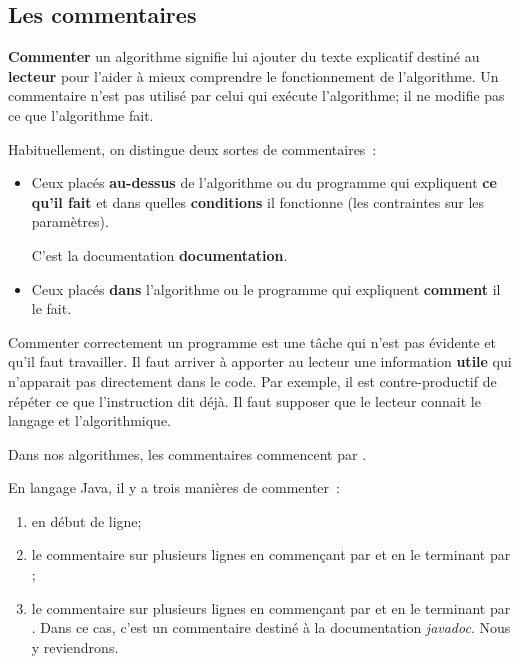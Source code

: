 				
		\subsection{Les commentaires}
	
			\textbf{Commenter} un algorithme
			signifie lui ajouter du texte explicatif
			destiné au \textbf{lecteur} pour l’aider à mieux
			comprendre le fonctionnement de l’algorithme.
			Un commentaire n’est pas utilisé par celui qui exécute
			l’algorithme; il ne modifie pas ce que l’algorithme fait.
			
			Habituellement, on distingue deux sortes de commentaires~:
			\begin{itemize}
			\item
				Ceux placés \textbf{au-dessus} de l’algorithme ou du programme
				qui expliquent \textbf{ce qu'il fait} 
				et dans quelles \textbf{conditions} il fonctionne
				(les contraintes sur les paramètres).
				\par C'est la documentation \textbf{documentation}.
			\item
				Ceux placés \textbf{dans} l’algorithme ou le programme
				qui expliquent \textbf{comment} il le fait.
			\end{itemize}
			
			Commenter correctement un programme est une tâche qui n’est pas
			évidente et qu’il faut travailler.  Il faut arriver à apporter au
			lecteur une information \textbf{utile} qui n’apparait pas
			directement dans le code.  Par exemple, il est contre-productif de
			répéter ce que l’instruction dit déjà. Il faut supposer que le 
			lecteur connait le langage et l'algorithmique.   

			Dans nos algorithmes, les commentaires commencent par \pc{//}. 

			En langage Java, il y a trois manières de commenter~:

			\begin{enumerate}
				\item \pc{//} en début de ligne;
				\item le commentaire sur plusieurs lignes en commençant par 
					\pc{/*} et en le terminant par \pc{*/};
					

				\item le commentaire sur plusieurs lignes en commençant par 
					\pc{/**} et en le terminant par \pc{*/}. Dans ce cas, 
					c'est un commentaire destiné à la documentation 
					\textit{javadoc}. Nous y reviendrons. 
			\end{enumerate}
			
